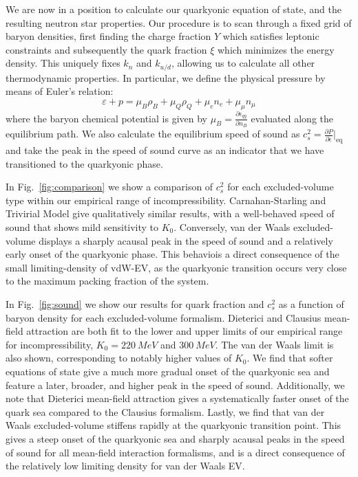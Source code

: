 \documentclass[twocolumn,floatfix,superscriptaddress,a4paper,showkeys,nofootinbib,reprint]{revtex4-1}
\begin{document}
We are now in a position to calculate our quarkyonic equation of state, and the resulting neutron star properties. Our procedure is to scan through a fixed grid of baryon densities, first finding the charge fraction $Y$ which satisfies leptonic constraints and subsequently the quark fraction $\xi$ which minimizes the energy density. This uniquely fixes $k_n$ and $k_{u/d}$, allowing us to calculate all other thermodynamic properties. In particular, we define the physical pressure by means of Euler's relation:
\begin{equation}
    \varepsilon + p = \mu_B \rho_B + \mu_Q \rho_Q + \mu_e n_e + \mu_\mu n_\mu
\end{equation}
where the baryon chemical potential is given by $\mu_B = \frac{\partial\epsilon_{qy}}{\partial n_B}$ evaluated along the equilibrium path. We also calculate the equilibrium speed of sound as $c_s^2 = \frac{\partial P}{\partial\epsilon}\big|_{\mathrm{eq}}$ and take the peak in the speed of sound curve as an indicator that we have transitioned to the quarkyonic phase. 

In Fig.~\ref{fig:comparison} we show a comparison of $c_s^2$ for each excluded-volume type within our empirical range of incompressibility. Carnahan-Starling and Trivirial Model give qualitatively similar results, with a well-behaved speed of sound that shows mild sensitivity to $K_0$. Conversely, van der Waals excluded-volume displays a sharply acausal peak in the speed of sound and a relatively early onset of the quarkyonic phase. This behaviois a direct consequence of the small limiting-density of vdW-EV, as the quarkyonic transition occurs very close to the maximum packing fraction of the system. 

In Fig.~\ref{fig:sound} we show our results for quark fraction and $c_s^2$ as a function of baryon density for each excluded-volume formalism. Dieterici and Clausius mean-field attraction are both fit to the lower and upper limits of our empirical range for incompressibility, $K_0 = 220~MeV$ and $300~ MeV$. The van der Waals limit is also shown, corresponding to notably higher values of $K_0$. We find that softer equations of state give a much more gradual onset of the quarkyonic sea and feature a later, broader, and higher peak in the speed of sound. Additionally, we note that Dieterici mean-field attraction gives a systematically faster onset of the quark sea compared to the Clausius formalism. Lastly, we find that van der Waals excluded-volume stiffens rapidly at the quarkyonic transition point. This gives a steep onset of the quarkyonic sea and sharply acausal peaks in the speed of sound for all mean-field interaction formalisms, and is a direct consequence of the relatively low limiting density for van der Waals EV. 
\end{document}
